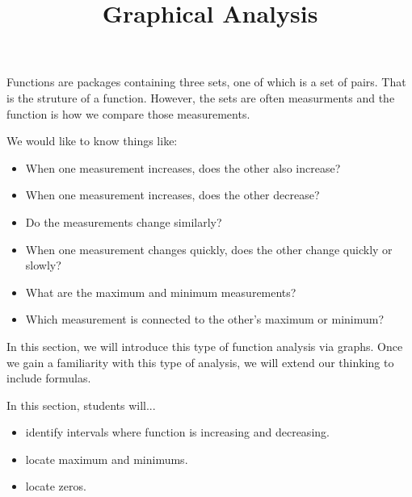\documentclass{ximera}
\title{Graphical Analysis}
\begin{document}
\begin{abstract}
\end{abstract}
\maketitle




Functions are packages containing three sets, one of which is a set of pairs.  That is the struture of a function.  However, the sets are often measurments and the function is how we compare those measurements.

We would like to know things like:

\begin{itemize}
\item When one measurement increases, does the other also increase?
\item When one measurement increases, does the other decrease?
\item Do the measurements change similarly?
\item When one measurement changes quickly, does the other change quickly or slowly?
\item What are the maximum and minimum measurements?
\item Which measurement is connected to the other's maximum or minimum?
\end{itemize}


In this section, we will introduce this type of function analysis via graphs. Once we gain a familiarity with this type of analysis, we will extend our thinking to include formulas.











\begin{sectionOutcomes}
In this section, students will...

\begin{itemize}
\item identify intervals where function is increasing and decreasing.
\item locate maximum and minimums.
\item locate zeros.
\end{itemize}
\end{sectionOutcomes}
\end{document}
